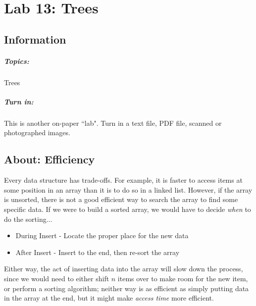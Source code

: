 \documentclass[a4paper,12pt,oneside]{book}
\title{}
\author{Rachel Morris}
\date{\today}
\newcommand{\laLab}{Lab 13: Trees\ }
\begin{document}
    \chapter*{\laLab} 

        \section{Information}
            \paragraph{ Topics: } Trees
            \paragraph{ Turn in: } This is another on-paper ``lab". Turn in a text file, PDF file, scanned or photographed images.
            

    \hrulefill

    \section{About: Efficiency}

    Every data structure has trade-offs. For example,
    it is faster to access items at some position in an array
    than it is to do so in a linked list. However, if the array is
    unsorted, there is not a good efficient way to search the array
    to find some specific data.
    If we were to build a sorted array, we would have to
    decide \textit{when} to do the sorting...

    \begin{itemize}
        \item   During Insert - Locate the proper place for the new data
        \item   After Insert - Insert to the end, then re-sort the array
    \end{itemize}

    Either way, the act of inserting data into the array will slow
    down the process, since we would need to either shift $n$ items over
    to make room for the new item, or perform a sorting algorithm;
    neither way is as efficient as simply putting data in the array at the
    end, but it might make \textit{access time} more efficient.
\end{document}
